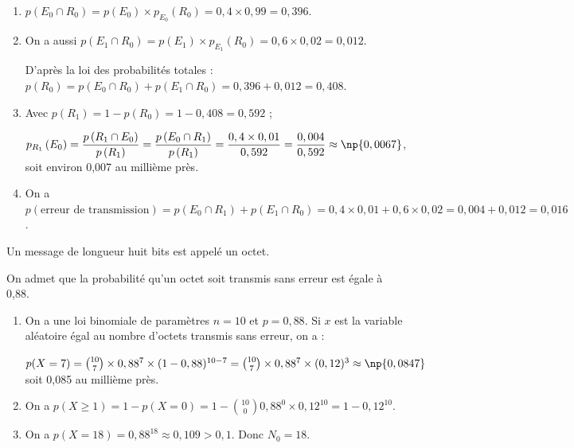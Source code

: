 \begin{enumerate}
\item 
$p\left(E_0 \cap R_0\right) = p\left(E_0 \right) \times p_{E_0}\left(R_0 \right) = 0,4 \times 0,99 = 0,396$.






\item 
On a aussi $p\left(E_1 \cap R_0\right) = p\left(E_1 \right) \times p_{E_1}\left(R_0 \right) = 0,6 \times 0,02 = 0,012$.

 D'après la loi des probabilités totales : $p\left(R_0\right) = p\left(E_0 \cap R_0\right) + p\left(E_1 \cap R_0\right) = 0,396 + 0,012 = 0,408$.





\item 

Avec $p\left(R_1 \right) = 1 - p\left(R_0\right) = 1 - 0,408 = 0,592$ ;

$p_{R_1}\left(E_0\right) = \dfrac{p\left(R_1 \cap E_0 \right)}{p\left(R_1\right)} = \dfrac{p\left(E_0 \cap R_1 \right)}{p\left(R_1\right)} = \dfrac{0,4 \times 0,01}{0,592} = \dfrac{0,004}{0,592} \approx \np{0,0067}$, soit environ 0,007 au millième près.





\item 





On a $p(\text{erreur de transmission}) = p\left(E_0 \cap R_1\right) + p\left(E_1 \cap R_0\right) = 0,4 \times 0,01 + 0,6 \times 0,02 = 0,004 + 0,012 = 0,016$.
\end{enumerate}

Un message de longueur huit bits est appelé un octet.

On admet que la probabilité qu'un octet soit transmis sans erreur est égale à 0,88.

\begin{enumerate}[resume]
\item 








On a une loi binomiale de paramètres $n = 10$ et $p = 0,88$. Si $x$ est la variable aléatoire égal au nombre d'octets transmis sans erreur, on a :

$p(X = 7) = \binom{10}{7}\times 0,88^7 \times (1 - 0,88)^{10-7} = \binom{10}{7}\times 0,88^7 \times (0,12)^{3} \approx \np{0,0847}$ soit 0,085 au millième près.
\item 








On a $p(X \geqslant 1) = 1 - p(X = 0) = 1 - \binom{10}{0}0,88^{0} \times 0,12^{10} = 1 - 0,12^{10}$.
\item 










On a $p(X = 18) = 0,88^{18} \approx 0,109 > 0,1$. Donc $N_0 = 18$.
\end{enumerate}
